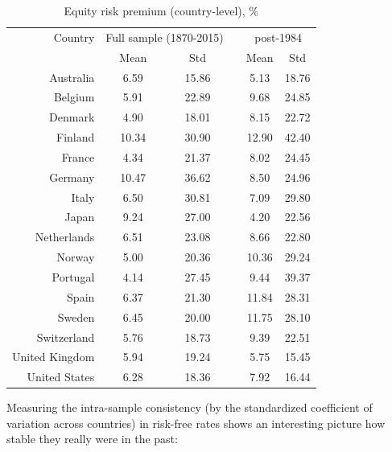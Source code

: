 {{\renewcommand{\arraystretch}{1}
\begin{table}[H]
\begin{center}
\begin{tabular}{rccccc}
\hline
\hline
Country & \multicolumn{2}{c}{Full sample (1870-2015)} & & \multicolumn{2}{c}{post-1984} \\
\cline{2-3} \cline{5-6}
& Mean & Std & & Mean & Std\\
\hline
Australia & 6.59 & 15.86 & & 5.13 & 18.76\\
Belgium & 5.91 & 22.89 & & 9.68 & 24.85\\
Denmark & 4.90 & 18.01 & & 8.15 & 22.72\\
Finland & 10.34 & 30.90 & & 12.90 & 42.40\\
France & 4.34 & 21.37 & & 8.02 & 24.45\\
Germany & 10.47 & 36.62 & & 8.50 & 24.96\\
Italy & 6.50 & 30.81 & & 7.09 & 29.80\\
Japan & 9.24 & 27.00 & & 4.20 & 22.56\\
Netherlands & 6.51 & 23.08 & & 8.66 & 22.80\\
Norway & 5.00 & 20.36 & & 10.36 & 29.24\\
Portugal & 4.14 & 27.45 & & 9.44 & 39.37\\
Spain & 6.37 & 21.30 & & 11.84 & 28.31\\
Sweden & 6.45 & 20.00 & & 11.75 & 28.10\\
Switzerland & 5.76 & 18.73 & & 9.39 & 22.51\\
United Kingdom & 5.94 & 19.24 & & 5.75 & 15.45\\
United States & 6.28 & 18.36 & & 7.92 & 16.44\\
\hline
\hline
\end{tabular} 
\end{center}
\caption{Equity risk premium (country-level), \%}
\label{tab:erp_countries}
\end{table}

Measuring the intra-sample consistency (by the standardized coefficient of variation across countries) in risk-free rates shows an interesting picture how stable they really were in the past:

}}
